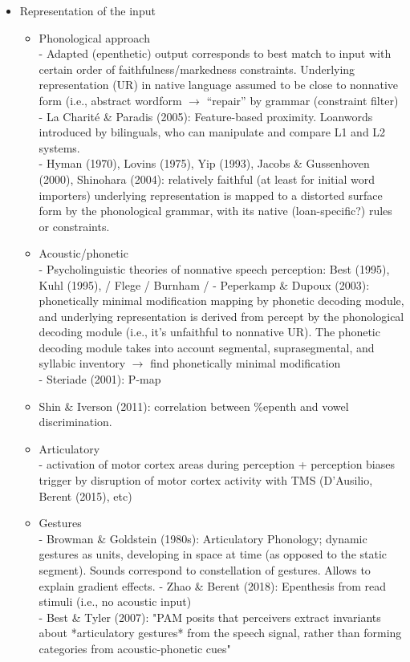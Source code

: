 \begin{itemize}
\item Representation of the input
  \begin{itemize}
  \item Phonological approach \\
    - Adapted (epenthetic) output corresponds to best match to input with certain order of faithfulness/markedness constraints. Underlying representation (UR) in native language assumed to be close to nonnative form (i.e., abstract wordform $\rightarrow$ ``repair'' by grammar (constraint filter)
    - La Charité \& Paradis (2005): Feature-based proximity. Loanwords introduced by bilinguals, who can manipulate and compare L1 and L2 systems. \\
    - Hyman (1970), Lovins (1975), Yip (1993), Jacobs \& Gussenhoven (2000), Shinohara (2004): relatively faithful (at least for initial word importers) underlying representation is mapped to a distorted surface form by the phonological grammar, with its native (loan-specific?) rules or constraints.  
  \item Acoustic/phonetic \\
    - Psycholinguistic theories of nonnative speech perception: Best (1995), Kuhl (1995), / Flege / Burnham /  
    - Peperkamp \& Dupoux (2003): phonetically minimal modification mapping by phonetic decoding module, and underlying representation is derived from percept by the phonological decoding module (i.e., it's unfaithful to nonnative UR). The phonetic decoding module takes into account segmental, suprasegmental, and syllabic inventory $\rightarrow$ find phonetically minimal modification \\
    - Steriade (2001): P-map
  \item Shin \& Iverson (2011): correlation between \%epenth and vowel discrimination.   
  \item Articulatory \\
    - activation of motor cortex areas during perception + perception biases trigger by disruption of motor cortex activity with TMS (D'Ausilio, Berent (2015), etc)
  \item Gestures \\
    - Browman \& Goldstein (1980s): Articulatory Phonology; dynamic gestures as units, developing in space at time (as opposed to the static segment). Sounds correspond to constellation of gestures. Allows to explain gradient effects.  
    - Zhao \& Berent (2018): Epenthesis from read stimuli (i.e., no acoustic input) \\
    - Best \& Tyler (2007): "PAM posits that perceivers extract invariants about *articulatory gestures* from the speech signal, rather than forming categories from acoustic-phonetic cues"
  \end{itemize}
\end{itemize}

